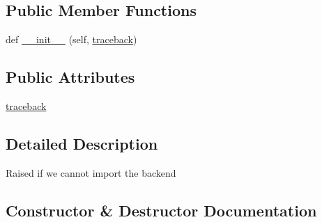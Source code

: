 \subsection*{Public Member Functions}
\begin{DoxyCompactItemize}
\item 
def \hyperlink{classpip_1_1__vendor_1_1pep517_1_1in__process_1_1__in__process_1_1BackendUnavailable_a568ce8780c2cae710eee30af1f439453}{\+\_\+\+\_\+init\+\_\+\+\_\+} (self, \hyperlink{classpip_1_1__vendor_1_1pep517_1_1in__process_1_1__in__process_1_1BackendUnavailable_ab93589fe53d537103120cea87a6feebb}{traceback})
\end{DoxyCompactItemize}
\subsection*{Public Attributes}
\begin{DoxyCompactItemize}
\item 
\hyperlink{classpip_1_1__vendor_1_1pep517_1_1in__process_1_1__in__process_1_1BackendUnavailable_ab93589fe53d537103120cea87a6feebb}{traceback}
\end{DoxyCompactItemize}


\subsection{Detailed Description}
\begin{DoxyVerb}Raised if we cannot import the backend\end{DoxyVerb}
 

\subsection{Constructor \& Destructor Documentation}
\mbox{\label{classpip_1_1__vendor_1_1pep517_1_1in__process_1_1__in__process_1_1BackendUnavailable_a568ce8780c2cae710eee30af1f439453}} 

